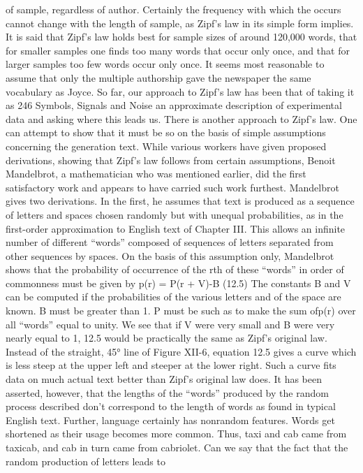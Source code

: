 {{{{{{{{{{{{of sample, regardless of author. Certainly the frequency with which
the occurs cannot change with the length of sample, as Zipf’s law
in its simple form implies. It is said that Zipf’s law holds best for
sample sizes of around 120,000 words, that for smaller samples one
finds too many words that occur only once, and that for larger
samples too few words occur only once. It seems most reasonable
to assume that only the multiple authorship gave the newspaper
the same vocabulary as Joyce.
So far, our approach to Zipf’s law has been that of taking it as
246
Symbols, Signals and Noise
an approximate description of experimental data and asking where
this leads us. There is another approach to Zipf’s law. One can
attempt to show that it must be so on the basis of simple assumptions
concerning the generation text. While various workers have
given proposed derivations, showing that Zipf’s law follows from
certain assumptions, Benoit Mandelbrot, a mathematician who was
mentioned earlier, did the first satisfactory work and appears to
have carried such work furthest.
Mandelbrot gives two derivations. In the first, he assumes that
text is produced as a sequence of letters and spaces chosen randomly
but with unequal probabilities, as in the first-order approximation
to English text of Chapter III. This allows an infinite
number of different “words” composed of sequences of letters
separated from other sequences by spaces.
On the basis of this assumption only, Mandelbrot shows that
the probability of occurrence of the rth of these “words” in order
of commonness must be given by
p(r) = P(r + V)-B (12.5)
The constants B and V can be computed if the probabilities of the
various letters and of the space are known. B must be greater than
1. P must be such as to make the sum ofp(r) over all “words” equal
to unity.
We see that if V were very small and B were very nearly equal
to 1, 12.5 would be practically the same as Zipf’s original law.
Instead of the straight, 45° line of Figure XII-6, equation 12.5
gives a curve which is less steep at the upper left and steeper at
the lower right. Such a curve fits data on much actual text better
than Zipf’s original law does.
It has been asserted, however, that the lengths of the “words”
produced by the random process described don’t correspond to
the length of words as found in typical English text.
Further, language certainly has nonrandom features. Words get
shortened as their usage becomes more common. Thus, taxi and
cab came from taxicab, and cab in turn came from cabriolet. Can
we say that the fact that the random production of letters leads to
}}}}}}}}}}}}
